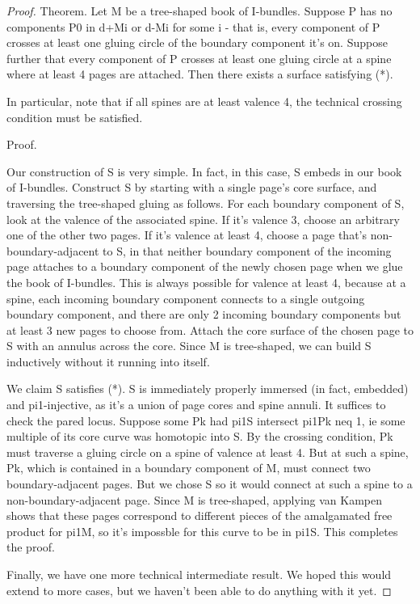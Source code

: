 \documentclass[12pt]{amsart}
\theoremstyle{definition}
\begin{document}
\begin{proof}
Theorem. Let M be a tree-shaped book of I-bundles. Suppose P has no components
P0 in d+Mi or d-Mi for some i - that is, every component of P crosses at least
one gluing circle of the boundary component it's on. Suppose further that every
component of P crosses at least one gluing circle at a spine where at least
4 pages are attached. Then there exists a surface satisfying (*).

In particular, note that if all spines are at least valence 4, the technical
crossing condition must be satisfied.

Proof.

Our construction of S is very simple. In fact, in this case, S embeds in our
book of I-bundles. Construct S by starting with a single page's core surface,
and traversing the tree-shaped gluing as follows. For each boundary component
of S, look at the valence of the associated spine. If it's valence 3, choose an
arbitrary one of the other two pages. If it's valence at least 4, choose a page
that's non-boundary-adjacent to S, in that neither boundary component of the
incoming page attaches to a boundary component of the newly chosen page when we
glue the book of I-bundles. This is always possible for valence at least 4,
because at a spine, each incoming boundary component connects to a single
outgoing boundary component, and there are only 2 incoming boundary components
but at least 3 new pages to choose from. Attach the core surface of the chosen
page to S with an annulus across the core. Since M is tree-shaped, we can build
S inductively without it running into itself.

We claim S satisfies (*). S is immediately properly immersed (in fact,
embedded) and pi1-injective, as it's a union of page cores and spine annuli. It
suffices to check the pared locus. Suppose some Pk had pi1S intersect pi1Pk neq
1, ie some multiple of its core curve was homotopic into S. By the crossing
condition, Pk must traverse a gluing circle on a spine of valence at least 4.
But at such a spine, Pk, which is contained in a boundary component of M, must
connect two boundary-adjacent pages. But we chose S so it would
connect at such a spine to a non-boundary-adjacent page. Since M is
tree-shaped, applying van Kampen shows that these pages correspond to
different pieces of the amalgamated free product for pi1M, so it's impossble
for this curve to be in pi1S. This completes the proof.

Finally, we have one more technical intermediate result. We hoped this would
extend to more cases, but we haven't been able to do anything with it yet.


\end{proof}
\end{document}
